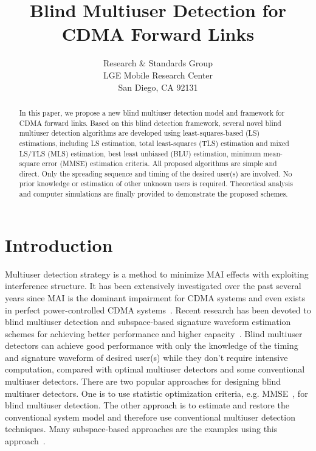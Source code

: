 \documentclass[a4paper,10pt,fleqn, twocolumn]{IEEETran}
\title{Blind Multiuser Detection for CDMA Forward Links}
\author{Research \& Standards Group\\ LGE Mobile Research Center\\San Diego, CA 92131}
\date{}
\begin{document}
\maketitle

\begin{abstract}\small
In this paper, we propose a new blind multiuser detection model
and framework for CDMA forward links. Based on this blind
detection framework, several novel blind multiuser detection
algorithms are developed using least-squares-based (LS)
estimations, including LS estimation, total least-squares (TLS)
estimation and mixed LS/TLS (MLS) estimation, best least unbiased
(BLU) estimation, minimum mean-square error (MMSE) estimation
criteria. All proposed algorithms are simple and direct. Only the
spreading sequence and timing of the desired user(s) are involved.
No prior knowledge or estimation of other unknown users is
required. Theoretical analysis and computer simulations are
finally provided to demonstrate the proposed schemes.
\end{abstract}


\section{Introduction}

Multiuser detection strategy is a method to minimize MAI effects
with exploiting interference structure. It has been extensively
investigated over the past several years since MAI is the dominant
impairment for CDMA systems and even exists in perfect
power-controlled CDMA systems~\cite{Verd98}. Recent research has
been devoted to blind multiuser detection and subspace-based
signature waveform estimation schemes for achieving better
performance and higher
capacity~\cite{Madh94,Honi95,Poor97,Wang98,Torl97,Liu96}. Blind
multiuser detectors can achieve good performance with only the
knowledge of the timing and signature waveform of desired user(s)
while they don't require intensive computation, compared with
optimal multiuser detectors and some conventional multiuser
detectors. There are two popular approaches for designing blind
multiuser detectors. One is to use statistic optimization
criteria, e.g. MMSE~\cite{Madh94,Honi95}, for blind multiuser
detection. The other approach is to estimate and restore the
conventional system model and therefore use conventional multiuser
detection techniques. Many subspace-based approaches are the
examples using this approach~\cite{Yang95,Wang98,Poor98,Wang99}.
\end{document}
